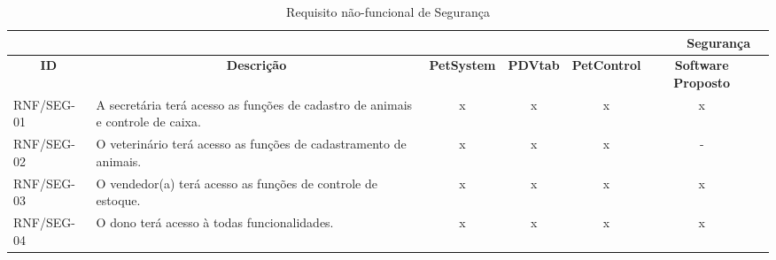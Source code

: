 \documentclass[12pt,openright,twoside,a4paper,english,french,spanish,brazil]{abntex2}
\begin{document}
\begin{landscape}
\begin{table}[!htpb]
\centering
\caption{Requisito não-funcional de Segurança}\label{tab:RNF_SEG}
\begin{small} 
\setlength{\tabcolsep}{3pt}
\begin{tabular}{|p{3cm}|p{}|c|c|c|cc|}
    \toprule
    \multicolumn{6}{r}{\textbf{Segurança}} \\
    \midrule
    \multicolumn{1}{c}{\textbf{ID}} & \multicolumn{1}{c}{\textbf{Descrição}} & \multicolumn{1}{c}{\textbf{PetSystem}} & \multicolumn{1}{c}{\textbf{PDVtab}} & \multicolumn{1}{c}{\textbf{PetControl}} & \multicolumn{1}{c}{\textbf{Software Proposto}} \\
    RNF/SEG-01 & A secretária terá acesso as funções de cadastro de animais e controle de caixa. & x & x & x & x \\
    RNF/SEG-02 & O veterinário terá acesso as funções de cadastramento de animais. & x & x & x & - \\
    RNF/SEG-03 & O vendedor(a) terá acesso as funções de controle de estoque. & x & x & x & x \\
    RNF/SEG-04 & O dono terá acesso à todas funcionalidades. & x & x & x & x \\
    \bottomrule
 \end{tabular}%
\end{small}
\end{table}


\end{landscape}
\end{document}
